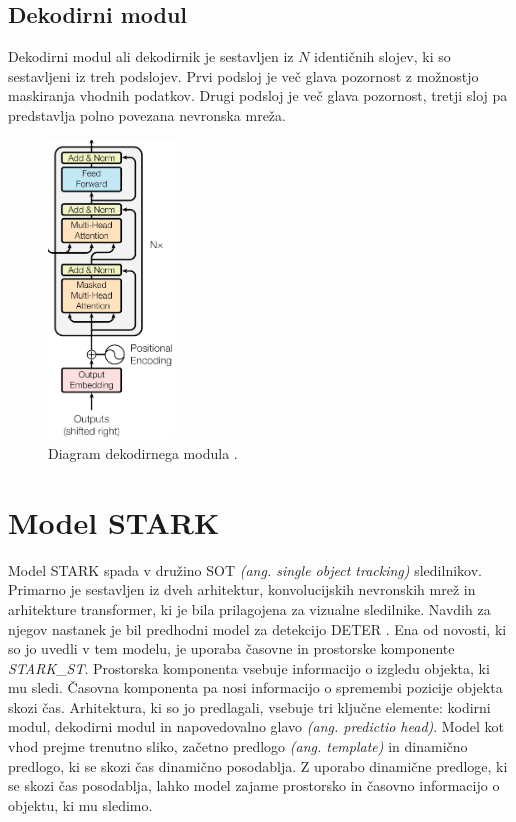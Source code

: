 \documentclass[a4paper,12pt,openright]{book}
\begin{document}
\subsection{Dekodirni modul}
Dekodirni modul ali dekodirnik je sestavljen iz $ N $ identičnih slojev, ki so sestavljeni iz treh podslojev. Prvi podsloj je več glava pozornost z možnostjo maskiranja vhodnih podatkov. Drugi podsloj je več glava pozornost, tretji sloj pa predstavlja polno povezana nevronska mreža.


\begin{figure}[htb]
    \begin{center}
        \includegraphics[width=0.3\textwidth]{img/decoder.png}
    \end{center}
    \caption{Diagram dekodirnega modula \cite{attention_is_all_you_need}.}
    \label{img:decoder}
\end{figure}

\section{Model STARK}
\label{sec:stark}
Model STARK \cite{stark} spada v družino SOT \emph{(ang. single object tracking)} sledilnikov. Primarno je sestavljen iz dveh arhitektur, konvolucijskih nevronskih mrež in arhitekture transformer, ki je bila prilagojena za vizualne sledilnike. Navdih za njegov nastanek je bil predhodni model za detekcijo DETER \cite{deter}. Ena od novosti, ki so jo uvedli v tem modelu, je uporaba časovne in prostorske komponente \emph{STARK\_ST}. Prostorska komponenta vsebuje informacijo o izgledu objekta, ki mu sledi. Časovna komponenta pa nosi informacijo o spremembi pozicije objekta skozi čas.
Arhitektura, ki so jo predlagali, vsebuje tri ključne elemente: kodirni modul, dekodirni modul in napovedovalno glavo \emph{(ang. predictio head)}. Model kot vhod prejme trenutno sliko, začetno predlogo \emph{(ang. template)} in dinamično predlogo, ki se skozi čas dinamično posodablja. Z uporabo dinamične predloge, ki se skozi čas posodablja, lahko model zajame prostorsko in časovno informacijo o objektu, ki mu sledimo.
\end{document}
